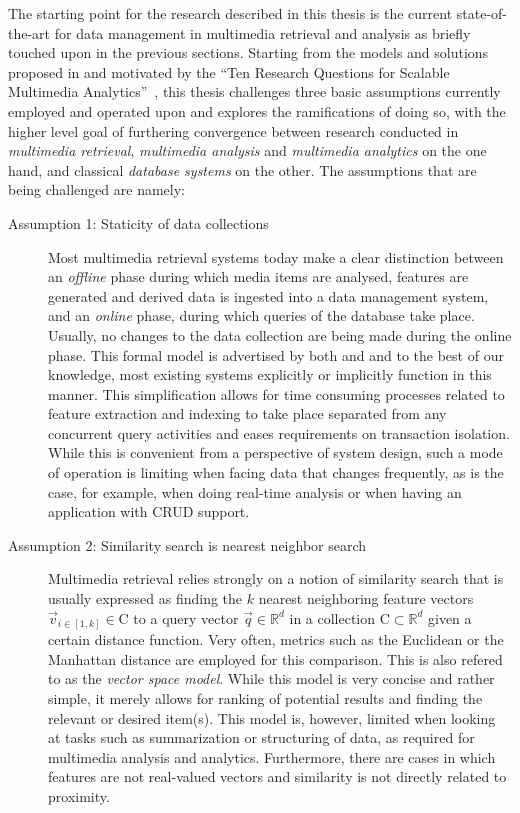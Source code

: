 The starting point for the research described in this thesis is the current state-of-the-art for data management in multimedia retrieval and analysis as briefly touched upon in the previous sections. Starting from the models and solutions proposed in \cite{Giangreco:2016adam,Giangreco:2018thesis} and motivated by the ``Ten Research Questions for Scalable Multimedia Analytics''~\cite{Jonson:2016}, this thesis challenges three basic assumptions currently employed and operated upon and explores the ramifications of doing so, with the higher level goal of furthering convergence between research conducted in \emph{multimedia retrieval}, \emph{multimedia analysis} and \emph{multimedia analytics} on the one hand, and classical \emph{database systems} on the other. The assumptions that are being challenged are namely:

\begin{description}
    \item[Assumption 1: Staticity of data collections] Most multimedia retrieval systems today make a clear distinction between an \emph{offline} phase during which media items are analysed, features are generated and derived data is ingested into a data management system, and an \emph{online} phase, during which queries of the database take place. Usually, no changes to the data collection are being made during the online phase. This formal model is advertised by both \cite{Giangreco:2018thesis} and \cite{Rossetto:2018thesis} and to the best of our knowledge, most existing systems explicitly or implicitly function in this manner. This simplification allows for time consuming processes related to feature extraction and indexing to take place separated from any concurrent query activities and eases requirements on transaction isolation. While this is convenient from a perspective of system design, such a mode of operation is limiting when facing data that changes frequently, as is the case, for example, when doing real-time analysis or when having an application with CRUD support.
   
    \item[Assumption 2: Similarity search is nearest neighbor search] Multimedia retrieval relies strongly on a notion of similarity search that is usually expressed as finding the $k$ nearest neighboring feature vectors $\vec{v}_{i \in \left[1,k\right]} \in \mathrm{C}$ to a query vector $\vec{q} \in \mathbb{R}^d$ in a collection $\mathrm{C} \subset \mathbb{R}^d$ given a certain distance function. Very often, metrics such as the Euclidean or the Manhattan distance are employed for this comparison. This is also refered to as the \emph{vector space model}. While this model is very concise and rather simple, it merely allows for ranking of potential results and finding the relevant or desired item(s). This model is, however, limited when looking at tasks such as summarization or structuring of data, as required for multimedia analysis and analytics. Furthermore, there are cases in which features are not real-valued vectors and similarity is not directly related to proximity.


\end{description}
